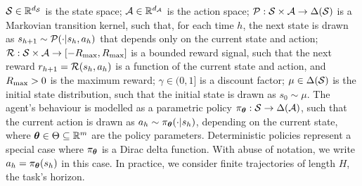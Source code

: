 $\mathcal{S}\in\mathbb{R}^{d_{\mathcal{S}}}$ is the state space; $\mathcal{A}\in\mathbb{R}^{d_{\mathcal{A}}}$ is the action space; $\mathcal{P}:\mathcal{S}\times\mathcal{A}\to\Delta(\mathcal{S})$ is a Markovian transition kernel, such that, for each time $h$, the next state is drawn as $s_{h+1}\sim\mathcal{P}(\cdot|s_h,a_h)$ that depends only on the current state and action; $\mathcal{R}:\mathcal{S}\times\mathcal{A}\to[-R_{\max},R_{\max}]$ is a bounded reward signal, such that the next reward $r_{h+1} = \mathcal{R}(s_h,a_h)$ is a function of the current state and action, and $R_{\max}>0$ is the maximum reward; $\gamma\in(0,1]$ is a discount factor; $\mu\in\Delta(\mathcal{S})$ is the initial state distribution, such that the initial state is drawn as $s_0\sim\mu$. The agent's behaviour is modelled as a parametric policy $\pi_{\boldsymbol{\theta}}:\mathcal{S}\to\Delta(\mathcal{A})$, such that the current action is drawn as $a_h\sim\pi_{\boldsymbol{\theta}}(\cdot|s_h)$, depending on the current state, where $\boldsymbol{\theta}\in\Theta\subseteq\mathbb{R}^m$ are the policy parameters. Deterministic policies represent a special case where $\pi_{\boldsymbol{\theta}}$ is a Dirac delta function. With abuse of notation, we write $a_h=\pi_{\boldsymbol{\theta}}(s_h)$ in this case. In practice, we consider finite trajectories of length $H$, the task's horizon.